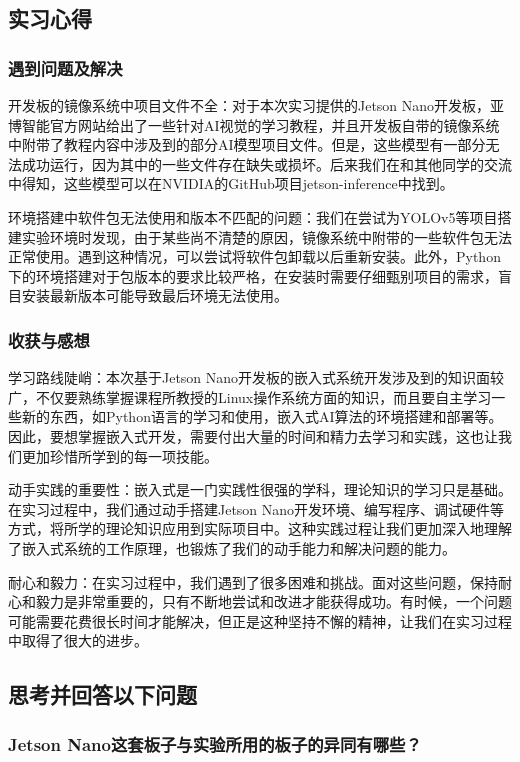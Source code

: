 \documentclass[UTF8]{article}
\begin{document}
\subsection{实习心得}
\subsubsection{遇到问题及解决} 

开发板的镜像系统中项目文件不全：对于本次实习提供的Jetson Nano开发板，亚博智能官方网站给出了一些针对AI视觉的学习教程，并且开发板自带的镜像系统中附带了教程内容中涉及到的部分AI模型项目文件。但是，这些模型有一部分无法成功运行，因为其中的一些文件存在缺失或损坏。后来我们在和其他同学的交流中得知，这些模型可以在NVIDIA的GitHub项目jetson-inference中找到。

环境搭建中软件包无法使用和版本不匹配的问题：我们在尝试为YOLOv5等项目搭建实验环境时发现，由于某些尚不清楚的原因，镜像系统中附带的一些软件包无法正常使用。遇到这种情况，可以尝试将软件包卸载以后重新安装。此外，Python下的环境搭建对于包版本的要求比较严格，在安装时需要仔细甄别项目的需求，盲目安装最新版本可能导致最后环境无法使用。

\subsubsection{收获与感想} %
学习路线陡峭：本次基于Jetson Nano开发板的嵌入式系统开发涉及到的知识面较广，不仅要熟练掌握课程所教授的Linux操作系统方面的知识，而且要自主学习一些新的东西，如Python语言的学习和使用，嵌入式AI算法的环境搭建和部署等。因此，要想掌握嵌入式开发，需要付出大量的时间和精力去学习和实践，这也让我们更加珍惜所学到的每一项技能。

动手实践的重要性：嵌入式是一门实践性很强的学科，理论知识的学习只是基础。在实习过程中，我们通过动手搭建Jetson Nano开发环境、编写程序、调试硬件等方式，将所学的理论知识应用到实际项目中。这种实践过程让我们更加深入地理解了嵌入式系统的工作原理，也锻炼了我们的动手能力和解决问题的能力。

耐心和毅力：在实习过程中，我们遇到了很多困难和挑战。面对这些问题，保持耐心和毅力是非常重要的，只有不断地尝试和改进才能获得成功。有时候，一个问题可能需要花费很长时间才能解决，但正是这种坚持不懈的精神，让我们在实习过程中取得了很大的进步。

\subsection{思考并回答以下问题}
\subsubsection{Jetson Nano这套板子与实验所用的板子的异同有哪些？} 
\end{document}
